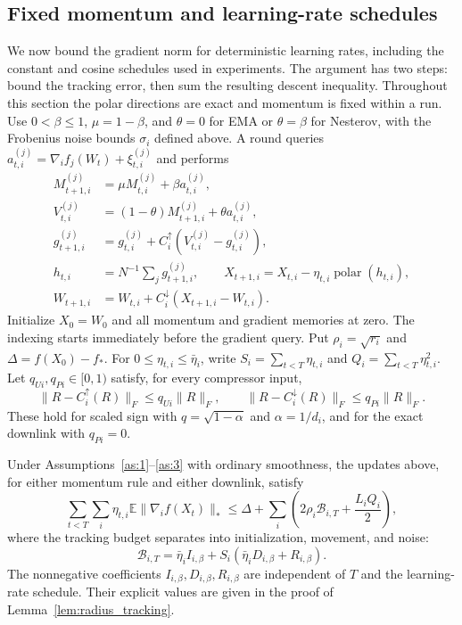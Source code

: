 \begin{codex}
\subsection{Fixed momentum and learning-rate schedules}
\label{app:fixed_radius}

We now bound the gradient norm for deterministic learning rates, including
the constant and cosine schedules used in experiments. The argument has
two steps: bound the tracking error, then sum the resulting descent
inequality. Throughout this section the polar directions are exact and
momentum is fixed within a run.
Use $0<\beta\le1$, $\mu=1-\beta$, and $\theta=0$ for EMA or
$\theta=\beta$ for Nesterov, with the Frobenius noise bounds $\sigma_i$
defined above. A round queries
$a_{t,i}^{(j)}=\nabla_i f_j(W_t)+\xi_{t,i}^{(j)}$ and performs
\begin{align*}
 M_{t+1,i}^{(j)}&=\mu M_{t,i}^{(j)}+\beta a_{t,i}^{(j)},\\
 V_{t,i}^{(j)}&=(1-\theta)M_{t+1,i}^{(j)}+\theta a_{t,i}^{(j)},\\
 g_{t+1,i}^{(j)}&=g_{t,i}^{(j)}
       +C_i^\uparrow(V_{t,i}^{(j)}-g_{t,i}^{(j)}),\\
 h_{t,i}&=N^{-1}\sum_jg_{t+1,i}^{(j)},\qquad
 X_{t+1,i}=X_{t,i}-\eta_{t,i}\operatorname{polar}(h_{t,i}),\\
 W_{t+1,i}&=W_{t,i}+C_i^\downarrow(X_{t+1,i}-W_{t,i}).
\end{align*}
Initialize $X_0=W_0$ and all momentum and gradient memories at zero.
The indexing starts immediately before the gradient query.
Put $\rho_i=\sqrt{r_i}$ and $\Delta=f(X_0)-f_*$.
For $0\le\eta_{t,i}\le\bar\eta_i$, write
$S_i=\sum_{t<T}\eta_{t,i}$ and $Q_i=\sum_{t<T}\eta_{t,i}^2$.
Let $q_{Ui},q_{Pi}\in[0,1)$ satisfy, for every compressor input,
\[
 \|R-C_i^\uparrow(R)\|_F\le q_{Ui}\|R\|_F,\qquad
 \|R-C_i^\downarrow(R)\|_F\le q_{Pi}\|R\|_F.
\]
These hold for scaled sign with $q=\sqrt{1-\alpha}$ and
$\alpha=1/d_i$, and for the exact downlink with $q_{Pi}=0$.

\begin{theorem}\label{thm:fixed_radius}
Under Assumptions~\ref{as:1}--\ref{as:3} with ordinary smoothness,
the updates above, for either momentum rule and either downlink, satisfy
\begin{equation}\label{eq:radius_stationarity}
 \sum_{t<T}\sum_i\eta_{t,i}\mathbb E\|\nabla_i f(X_t)\|_*
 \le\Delta+\sum_i\left(2\rho_i\mathcal B_{i,T}
                         +\frac{L_iQ_i}{2}\right),
\end{equation}
where the tracking budget separates into initialization, movement, and noise:
\[
 \mathcal B_{i,T}=\bar\eta_i I_{i,\beta}
                   +S_i(\bar\eta_i D_{i,\beta}+R_{i,\beta}).
\]
The nonnegative coefficients $I_{i,\beta},D_{i,\beta},R_{i,\beta}$ are
independent of $T$ and the learning-rate schedule. Their explicit values
are given in the proof of Lemma~\ref{lem:radius_tracking}.
\end{theorem}


\end{codex}

